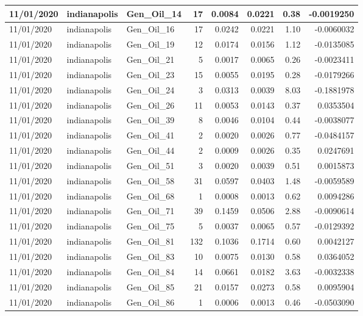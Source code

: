 \documentclass[
  letterpaper,
  DIV=11,
  numbers=noendperiod]{scrartcl}
\begin{document}
\begin{tabular}{l|l|l|r|r|r|r|r}
\hline
11/01/2020 & indianapolis & Gen\_Oil\_14 & 17 & 0.0084 & 0.0221 & 0.38 & -0.0019250\\
\hline
11/01/2020 & indianapolis & Gen\_Oil\_16 & 17 & 0.0242 & 0.0221 & 1.10 & -0.0060032\\
\hline
11/01/2020 & indianapolis & Gen\_Oil\_19 & 12 & 0.0174 & 0.0156 & 1.12 & -0.0135085\\
\hline
11/01/2020 & indianapolis & Gen\_Oil\_21 & 5 & 0.0017 & 0.0065 & 0.26 & -0.0023411\\
\hline
11/01/2020 & indianapolis & Gen\_Oil\_23 & 15 & 0.0055 & 0.0195 & 0.28 & -0.0179266\\
\hline
11/01/2020 & indianapolis & Gen\_Oil\_24 & 3 & 0.0313 & 0.0039 & 8.03 & -0.1881978\\
\hline
11/01/2020 & indianapolis & Gen\_Oil\_26 & 11 & 0.0053 & 0.0143 & 0.37 & 0.0353504\\
\hline
11/01/2020 & indianapolis & Gen\_Oil\_39 & 8 & 0.0046 & 0.0104 & 0.44 & -0.0038077\\
\hline
11/01/2020 & indianapolis & Gen\_Oil\_41 & 2 & 0.0020 & 0.0026 & 0.77 & -0.0484157\\
\hline
11/01/2020 & indianapolis & Gen\_Oil\_44 & 2 & 0.0009 & 0.0026 & 0.35 & 0.0247691\\
\hline
11/01/2020 & indianapolis & Gen\_Oil\_51 & 3 & 0.0020 & 0.0039 & 0.51 & 0.0015873\\
\hline
11/01/2020 & indianapolis & Gen\_Oil\_58 & 31 & 0.0597 & 0.0403 & 1.48 & -0.0059589\\
\hline
11/01/2020 & indianapolis & Gen\_Oil\_68 & 1 & 0.0008 & 0.0013 & 0.62 & 0.0094286\\
\hline
11/01/2020 & indianapolis & Gen\_Oil\_71 & 39 & 0.1459 & 0.0506 & 2.88 & -0.0090614\\
\hline
11/01/2020 & indianapolis & Gen\_Oil\_75 & 5 & 0.0037 & 0.0065 & 0.57 & -0.0129392\\
\hline
11/01/2020 & indianapolis & Gen\_Oil\_81 & 132 & 0.1036 & 0.1714 & 0.60 & 0.0042127\\
\hline
11/01/2020 & indianapolis & Gen\_Oil\_83 & 10 & 0.0075 & 0.0130 & 0.58 & 0.0364052\\
\hline
11/01/2020 & indianapolis & Gen\_Oil\_84 & 14 & 0.0661 & 0.0182 & 3.63 & -0.0032338\\
\hline
11/01/2020 & indianapolis & Gen\_Oil\_85 & 21 & 0.0157 & 0.0273 & 0.58 & 0.0095904\\
\hline
11/01/2020 & indianapolis & Gen\_Oil\_86 & 1 & 0.0006 & 0.0013 & 0.46 & -0.0503090\\

\end{tabular}
\end{document}
